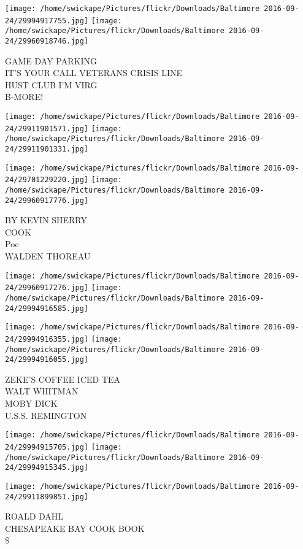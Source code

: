 \documentclass[10pt,letterpaper]{article}
\begin{document}
\texttt{[image: /home/swickape/Pictures/flickr/Downloads/Baltimore 2016-09-24/29994917755.jpg]}
\texttt{[image: /home/swickape/Pictures/flickr/Downloads/Baltimore 2016-09-24/29960918746.jpg]}

GAME DAY PARKING\\
IT'S YOUR CALL VETERANS CRISIS LINE\\
HUST CLUB I'M VIRG\\
B{-}MORE!
\pagebreak

\texttt{[image: /home/swickape/Pictures/flickr/Downloads/Baltimore 2016-09-24/29911901571.jpg]}
\texttt{[image: /home/swickape/Pictures/flickr/Downloads/Baltimore 2016-09-24/29911901331.jpg]}

\texttt{[image: /home/swickape/Pictures/flickr/Downloads/Baltimore 2016-09-24/29701229220.jpg]}
\texttt{[image: /home/swickape/Pictures/flickr/Downloads/Baltimore 2016-09-24/29960917776.jpg]}

BY KEVIN SHERRY\\
COOK\\
Poe\\
WALDEN THOREAU
\pagebreak

\texttt{[image: /home/swickape/Pictures/flickr/Downloads/Baltimore 2016-09-24/29960917276.jpg]}
\texttt{[image: /home/swickape/Pictures/flickr/Downloads/Baltimore 2016-09-24/29994916585.jpg]}

\texttt{[image: /home/swickape/Pictures/flickr/Downloads/Baltimore 2016-09-24/29994916355.jpg]}
\texttt{[image: /home/swickape/Pictures/flickr/Downloads/Baltimore 2016-09-24/29994916055.jpg]}

ZEKE'S COFFEE ICED TEA\\
WALT WHITMAN\\
MOBY DICK\\
U.S.S. REMINGTON
\pagebreak

\texttt{[image: /home/swickape/Pictures/flickr/Downloads/Baltimore 2016-09-24/29994915705.jpg]}
\texttt{[image: /home/swickape/Pictures/flickr/Downloads/Baltimore 2016-09-24/29994915345.jpg]}

\texttt{[image: /home/swickape/Pictures/flickr/Downloads/Baltimore 2016-09-24/29911899851.jpg]}

ROALD DAHL\\
CHESAPEAKE BAY COOK BOOK\\
\$
\pagebreak
\end{document}
